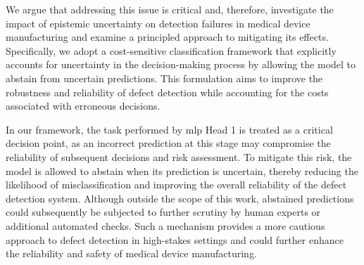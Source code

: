 

We argue that addressing this issue is critical and, therefore, investigate the impact of epistemic uncertainty on detection failures in medical device manufacturing and examine a principled approach to mitigating its effects. Specifically, we adopt a cost-sensitive classification framework that explicitly accounts for uncertainty in the decision-making process by allowing the model to abstain from uncertain predictions. This formulation aims to improve the robustness and reliability of defect detection while accounting for the costs associated with erroneous decisions.

In our framework, the task performed by \gls*{mlp} Head 1 is treated as a critical decision point, as an incorrect prediction at this stage may compromise the reliability of subsequent decisions and risk assessment. To mitigate this risk, the model is allowed to abstain when its prediction is uncertain, thereby reducing the likelihood of misclassification and improving the overall reliability of the defect detection system. Although outside the scope of this work, abstained predictions could subsequently be subjected to further scrutiny by human experts or additional automated checks. Such a mechanism provides a more cautious approach to defect detection in high-stakes settings and could further enhance the reliability and safety of medical device manufacturing.


